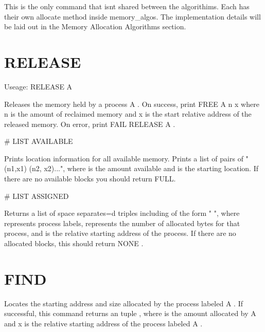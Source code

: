 This is the only command that isn\textquotesingle{}t shared between the algorithims. Each has their own allocate method inside memory\+\_\+algos. The implementation details will be laid out in the Memory Allocation Algorithms section.

\section*{R\+E\+L\+E\+A\+SE}

Useage\+: R\+E\+L\+E\+A\+SE A 
\begin{DoxyCode}
Releases the memory held by a process A . On success, print FREE A n x
where n is the amount of reclaimed memory and x is the start relative
address of the released memory. On error, print FAIL RELEASE A .
\end{DoxyCode}


\# L\+I\+ST A\+V\+A\+I\+L\+A\+B\+LE 
\begin{DoxyCode}
Prints location information for all available memory. Prints a list of pairs of "(n1,x1) (n2, x2)...", 
where is the amount available and is the starting
location. If there are no available blocks you should return FULL.
\end{DoxyCode}


\# L\+I\+ST A\+S\+S\+I\+G\+N\+ED 
\begin{DoxyCode}
Returns a list of space separates=d triples including of the form "
", where represents process labels, represents the number
of allocated bytes for that process, and is the relative starting address of the
process. If there are no allocated blocks, this should return NONE .
\end{DoxyCode}


\section*{F\+I\+ND}


\begin{DoxyCode}
Locates the starting address and size allocated by the process labeled A . If
successful, this command returns an tuple , where is the amount
allocated by A and x is the relative starting address of the process labeled
A .
\end{DoxyCode}
 